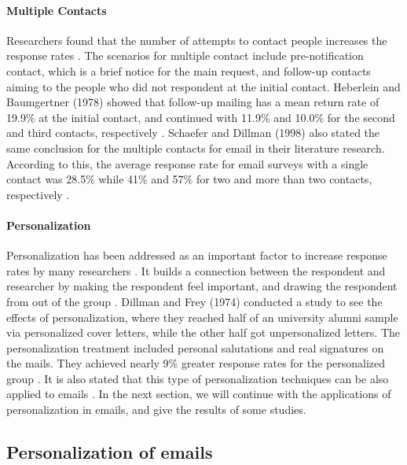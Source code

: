 \paragraph{Multiple Contacts}
Researchers found that the number of attempts to contact people increases the response rates \cite{Heberlein1978,Schaefer1998}. The scenarios for multiple contact include pre-notification contact, which is a brief notice for the main request, and follow-up contacts aiming to the people who did not respondent at the initial contact. Heberlein and Baumgertner (1978) showed that follow-up mailing has a mean return rate of 19.9\% at the initial contact, and continued with 11.9\% and 10.0\% for the second and third contacts, respectively \cite{Heberlein1978}. Schaefer and Dillman (1998) also stated the same conclusion for the multiple contacts for email in their literature research. According to this, the average response rate for email surveys with a single contact was 28.5\% while 41\% and 57\% for two and more than two contacts, respectively \cite{Schaefer1998}.

\paragraph{Personalization}
Personalization has been addressed as an important factor to increase response rates by many researchers \cite{Dillman1991,Schaefer1998}. It builds a connection between the respondent and researcher by making the respondent feel important, and drawing the respondent from out of the group \cite[page 272]{DillmanDonA.SmythJoleneD.Christian2009}. Dillman and Frey (1974) conducted a study to see the effects of personalization, where they reached half of an university alumni sample via personalized cover letters, while the other half got unpersonalized letters. The personalization treatment included personal salutations and real signatures on the mails. They achieved nearly 9\% greater response rates for the personalized group \cite{Dillman1974a}. It is also stated that this type of personalization techniques can be also applied to emails \cite{Schaefer1998}. In the next section, we will continue with the applications of personalization in emails, and give the results of some studies.

\subsection{Personalization of emails}
\label{sec:2.1.4:Pers}

